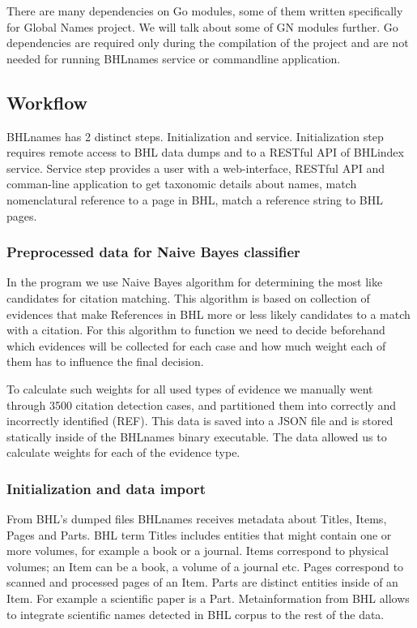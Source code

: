 \documentclass[
]{article}
\begin{document}
There are many dependencies on Go modules, some of them written
specifically for Global Names project. We will talk about some of GN
modules further. Go dependencies are required only during the
compilation of the project and are not needed for running BHLnames
service or commandline application.

\hypertarget{workflow}{%
\subsection{Workflow}\label{workflow}}

BHLnames has 2 distinct steps. Initialization and service.
Initialization step requires remote access to BHL data dumps and to a
RESTful API of BHLindex service. Service step provides a user with a
web-interface, RESTful API and comman-line application to get taxonomic
details about names, match nomenclatural reference to a page in BHL,
match a reference string to BHL pages.

\hypertarget{preprocessed-data-for-naive-bayes-classifier}{%
\subsubsection{Preprocessed data for Naive Bayes
classifier}\label{preprocessed-data-for-naive-bayes-classifier}}

In the program we use Naive Bayes algorithm for determining the most
like candidates for citation matching. This algorithm is based on
collection of evidences that make References in BHL more or less likely
candidates to a match with a citation. For this algorithm to function we
need to decide beforehand which evidences will be collected for each
case and how much weight each of them has to influence the final
decision.

To calculate such weights for all used types of evidence we manually
went through 3500 citation detection cases, and partitioned them into
correctly and incorrectly identified (REF). This data is saved into a
JSON file and is stored statically inside of the BHLnames binary
executable. The data allowed us to calculate weights for each of the
evidence type.

\hypertarget{initialization-and-data-import}{%
\subsubsection{Initialization and data
import}\label{initialization-and-data-import}}

From BHL's dumped files BHLnames receives metadata about Titles, Items,
Pages and Parts. BHL term Titles includes entities that might contain
one or more volumes, for example a book or a journal. Items correspond
to physical volumes; an Item can be a book, a volume of a journal etc.
Pages correspond to scanned and processed pages of an Item. Parts are
distinct entities inside of an Item. For example a scientific paper is a
Part. Metainformation from BHL allows to integrate scientific names
detected in BHL corpus to the rest of the data.
\end{document}
